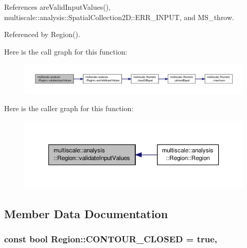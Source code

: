 References are\-Valid\-Input\-Values(), multiscale\-::analysis\-::\-Spatial\-Collection2\-D\-::\-E\-R\-R\-\_\-\-I\-N\-P\-U\-T, and M\-S\-\_\-throw.



Referenced by Region().



Here is the call graph for this function\-:
\nopagebreak
\begin{figure}[H]
\begin{center}
\leavevmode
\includegraphics[width=350pt]{classmultiscale_1_1analysis_1_1Region_a517b46fd89696f44086aafb1a9526995_cgraph}
\end{center}
\end{figure}




Here is the caller graph for this function\-:
\nopagebreak
\begin{figure}[H]
\begin{center}
\leavevmode
\includegraphics[width=350pt]{classmultiscale_1_1analysis_1_1Region_a517b46fd89696f44086aafb1a9526995_icgraph}
\end{center}
\end{figure}




\subsection{Member Data Documentation}
\hypertarget{classmultiscale_1_1analysis_1_1Region_a52c0c66ccfe38dc19379abaeba529f19}{
\subsubsection[{C\-O\-N\-T\-O\-U\-R\-\_\-\-C\-L\-O\-S\-E\-D}]{\setlength{\rightskip}{0pt plus 5cm}const bool Region\-::\-C\-O\-N\-T\-O\-U\-R\-\_\-\-C\-L\-O\-S\-E\-D = true\hspace{0.3cm}{\ttfamily [static]}, {\ttfamily [private]}}}\label{classmultiscale_1_1analysis_1_1Region_a52c0c66ccfe38dc19379abaeba529f19}


